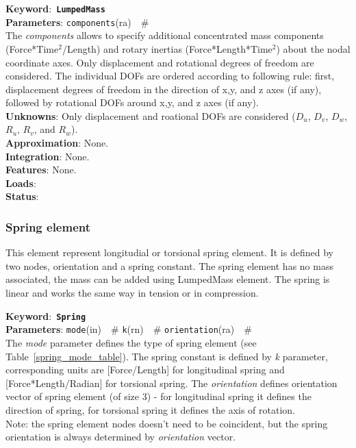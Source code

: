 \documentclass[a4paper]{article}
\newcommand{\descitem}[1]{{\noindent \bf #1}:}
\newcommand{\elemkeyword}[1]{\descitem{Keyword}~{\bf \texttt{#1}}}
\newcommand{\elemparam}[2]{{{\texttt{#1}\tiny (#2)}~~\#}}
\newcommand{\param}[1]{{\em #1}}
\begin{document}
\elemkeyword{LumpedMass}\\
\descitem{Parameters} \elemparam{components}{ra}\\
The \param{components} allows to specify additional concentrated mass components (Force*Time$^2$/Length) and rotary inertias (Force*Length*Time$^2$) about the nodal coordinate axes. Only displacement and rotational degrees of freedom are considered. The individual DOFs are ordered according to following rule: first, displacement degrees of freedom in the direction of x,y, and z axes (if any), followed by rotational DOFs around x,y, and z axes (if any).\\
\descitem{Unknowns}
Only displacement and roational DOFs are considered ($D_u$, $D_v$, $D_w$, $R_u$, $R_v$, and $R_w$).\\
\descitem{Approximation} None.\\
\descitem{Integration}
None.\\
\descitem{Features} None.\\
\descitem{Loads} \\
\descitem{Status} 

\subsubsection{Spring element}
This element represent longitudial or torsional spring element. It is defined by two nodes, orientation and a spring constant.
The spring element has no mass associated, the mass can be added using LumpedMass element. The spring is linear and works the same way in tension or in compression. 

\elemkeyword{Spring}\\
\descitem{Parameters} \elemparam{mode}{in} \elemparam{k}{rn} \elemparam{orientation}{ra}\\
The \param{mode} parameter defines the type of spring element (see Table~\ref{spring_mode_table}). The spring constant is defined by \param{k} parameter, corresponding units are [Force/Length] for longitudinal spring and [Force*Length/Radian] for torsional spring. The \param{orientation} defines orientation vector of spring element (of size 3) - for longitudinal spring it defines the direction of spring, for torsional spring it defines the axis of rotation.\\
Note: the spring element nodes doesn't need to be coincident, but the spring orientation is always determined by \param{orientation} vector.
\end{document}
